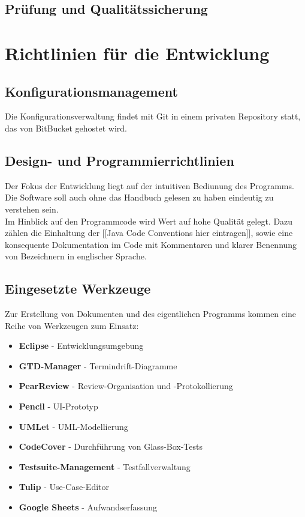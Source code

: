 \documentclass[11pt]{article}
\begin{document}
\subsection{Prüfung und Qualitätssicherung}

\section{Richtlinien für die Entwicklung}

\subsection{Konfigurationsmanagement}

Die Konfigurationsverwaltung findet mit Git in einem privaten Repository statt, das von BitBucket gehostet wird.

\subsection{Design- und Programmierrichtlinien}

Der Fokus der Entwicklung liegt auf der intuitiven Bediunung des Programms. Die Software soll auch ohne das Handbuch gelesen zu haben eindeutig zu verstehen sein.\\
Im Hinblick auf den Programmcode wird Wert auf hohe Qualität gelegt. Dazu zählen die Einhaltung der [[Java Code Conventions hier eintragen]], sowie eine konsequente Dokumentation im Code mit Kommentaren und klarer Benennung von Bezeichnern in englischer Sprache.

\subsection{Eingesetzte Werkzeuge}

Zur Erstellung von Dokumenten und des eigentlichen Programms kommen eine Reihe von Werkzeugen zum Einsatz:

\begin{itemize}
	\item \textbf{Eclipse} - Entwicklungsumgebung
	\item \textbf{GTD-Manager} - Termindrift-Diagramme
	\item \textbf{PearReview} - Review-Organisation und -Protokollierung
	\item \textbf{Pencil} - UI-Prototyp
	\item \textbf{UMLet} - UML-Modellierung
	\item \textbf{CodeCover} - Durchführung von Glass-Box-Tests
	\item \textbf{Testsuite-Management} - Testfallverwaltung
	\item \textbf{Tulip} - Use-Case-Editor
	\item \textbf{Google Sheets} - Aufwandserfassung
\end{itemize}
\end{document}
